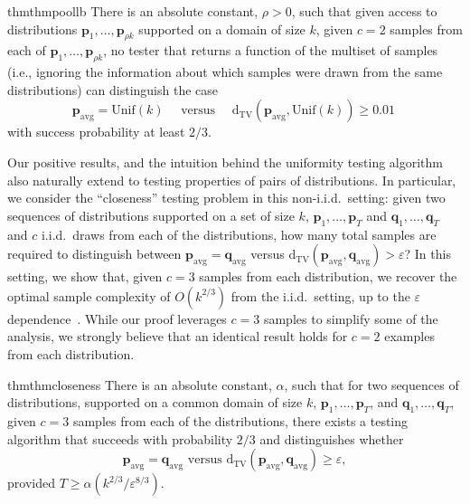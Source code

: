 \documentclass[10pt]{article} %
\def\eps{{\varepsilon}}
\theoremstyle{plain}
\newcommand{\bp}{\textbf{p}}
\newcommand{\unik}{\mathrm{Unif}(k)}%
\newcommand{\bq}{\textbf{q}}
\newcommand{\dtv}{\mathrm{d_{TV}}}
\newcommand{\avg}{\mathrm{avg}}
\begin{document}
\begin{restatable}{thm}{thmpoollb}
	\label{thm:poollb}
	There is an absolute constant, $\rho > 0$, such that given access to distributions $\bp_1,\ldots,\bp_{\rho k}$ supported on a domain of size $k$, given $c=2$ samples from each of $\bp_1,\ldots,\bp_{\rho k}$,  no tester that returns a function of the multiset of samples (i.e., ignoring the information about which samples were drawn from the same distributions) can distinguish the case 
	$$\bp_{\avg} =\unik \quad \text{ versus } \quad \dtv(\bp_{\avg},\unik) \geq 0.01~$$
	with success probability at least $2/3$.\end{restatable}

Our positive results, and the intuition behind the uniformity testing algorithm also naturally extend to testing properties of pairs of distributions.  In particular, we consider the ``closeness'' testing problem in this non-i.i.d.\ setting: given two sequences of distributions supported on a set of size $k$, $\bp_1,\ldots,\bp_T$ and $\bq_1,\ldots,\bq_T$ and $c$ i.i.d.\ draws from each of the distributions, how many total samples are required to distinguish between $\bp_{\avg}=\bq_{\avg}$ versus $\dtv(\bp_{\avg},\bq_{\avg}) > \eps$?  In this setting, we show that, given $c=3$ samples from each distribution, we recover the optimal sample complexity of $O(k^{2/3})$ from the i.i.d.\ setting, up to the $\eps$ dependence~\citep{batu2013testing,chan2014optimal}.  While our proof leverages $c=3$ samples to simplify some of the analysis, we strongly believe that an identical result holds for $c=2$ examples from each distribution.

\begin{restatable}{thm}{thmcloseness}
	\label{thm:closeness}
	There is an absolute constant, $\alpha$, such that for two sequences of distributions, supported on a common domain of size $k$, $\bp_1,\ldots,\bp_T$, and $\bq_1,\ldots,\bq_T$, given $c=3$ samples from each of the distributions, there exists a testing algorithm that succeeds with probability $2/3$ and distinguishes whether 
	$$\bp_{\avg} =\bq_{\avg} \text{ versus } \dtv(\bp_{\avg},\bq_{\avg}) \geq \eps,$$ provided  $T \ge \alpha(k^{2/3}/\eps^{8/3}).$
\end{restatable}
\end{document}
